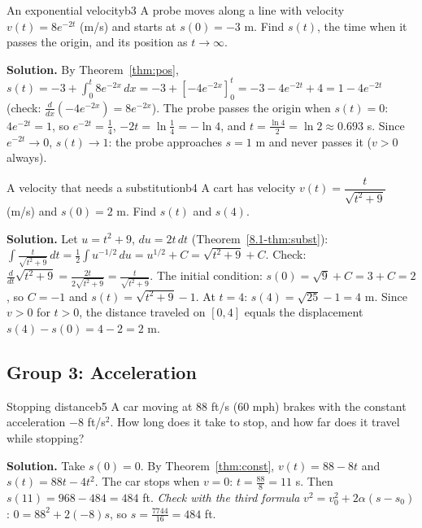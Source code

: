 \documentclass[11pt]{article}
\begin{document}
\begin{exmp}{An exponential velocity}{b3}
A probe moves along a line with velocity $v(t)=8e^{-2t}$ (m/s) and starts at $s(0)=-3$ m. Find $s(t)$, the time when it passes the origin, and its position as $t\to\infty$.

\textbf{Solution.} By Theorem~\ref{thm:pos}, $s(t)=-3+\int_0^t8e^{-2x}\,dx=-3+\left[-4e^{-2x}\right]_0^t=-3-4e^{-2t}+4=1-4e^{-2t}$ (check: $\frac{d}{dx}\left(-4e^{-2x}\right)=8e^{-2x}$).
The probe passes the origin when $s(t)=0$: $4e^{-2t}=1$, so $e^{-2t}=\frac14$, $-2t=\ln\frac14=-\ln4$, and $t=\frac{\ln4}2=\ln2\approx0.693$ s. Since $e^{-2t}\to0$, $s(t)\to1$: the probe approaches $s=1$ m and never passes it ($v>0$ always).
\end{exmp}

\begin{exmp}{A velocity that needs a substitution}{b4}
A cart has velocity $v(t)=\dfrac t{\sqrt{t^2+9}}$ (m/s) and $s(0)=2$ m. Find $s(t)$ and $s(4)$.

\textbf{Solution.} Let $u=t^2+9$, $du=2t\,dt$ (Theorem~\ref{8.1-thm:subst}): $\int\frac t{\sqrt{t^2+9}}\,dt=\frac12\int u^{-1/2}\,du=u^{1/2}+C=\sqrt{t^2+9}+C$. Check: $\frac d{dt}\sqrt{t^2+9}=\frac{2t}{2\sqrt{t^2+9}}=\frac t{\sqrt{t^2+9}}$. The initial condition: $s(0)=\sqrt9+C=3+C=2$, so $C=-1$ and $s(t)=\sqrt{t^2+9}-1$.
At $t=4$: $s(4)=\sqrt{25}-1=4$ m. Since $v>0$ for $t>0$, the distance traveled on $[0,4]$ equals the displacement $s(4)-s(0)=4-2=2$ m.
\end{exmp}

\subsection*{Group 3: Acceleration}

\begin{exmp}{Stopping distance}{b5}
A car moving at $88$ ft/s ($60$ mph) brakes with the constant acceleration $-8$ ft/s$^2$. How long does it take to stop, and how far does it travel while stopping?

\textbf{Solution.} Take $s(0)=0$. By Theorem~\ref{thm:const}, $v(t)=88-8t$ and $s(t)=88t-4t^2$. The car stops when $v=0$: $t=\frac{88}8=11$ s. Then $s(11)=968-484=484$ ft.
\emph{Check with the third formula} $v^2=v_0^2+2\alpha(s-s_0)$: $0=88^2+2(-8)s$, so $s=\frac{7744}{16}=484$ ft. \checkmark
\end{exmp}
\end{document}
